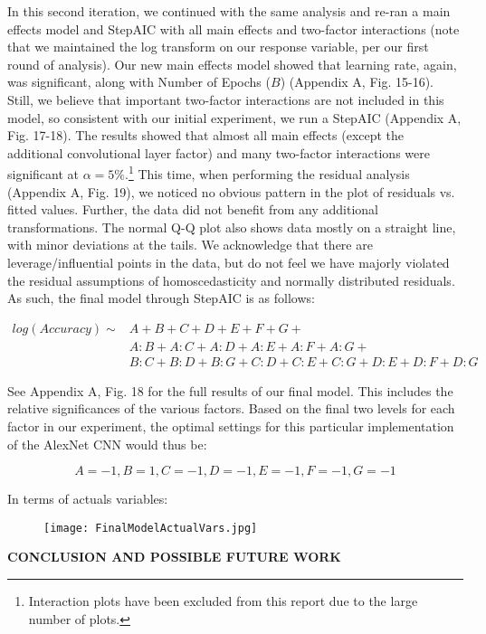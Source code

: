 \documentclass[12pt]{article}
\begin{document}
In this second iteration, we continued with the same analysis and re-ran a main effects model and StepAIC with all main effects and two-factor interactions (note that we maintained the log transform on our response variable, per our first round of analysis). Our new main effects model showed that learning rate, again, was significant, along with Number of Epochs ($B$) (Appendix A, Fig. 15-16). Still, we believe that important two-factor interactions are not included in this model, so consistent with our initial experiment, we run a StepAIC (Appendix A, Fig. 17-18). The results showed that almost all main effects (except the additional convolutional layer factor) and many two-factor interactions were significant at $\alpha = 5\%$.\footnote{Interaction plots have been excluded from this report due to the large number of plots. } This time, when performing the residual analysis (Appendix A, Fig. 19), we noticed no obvious pattern in the plot of residuals vs. fitted values. Further, the data did not benefit from any additional transformations.  The normal Q-Q plot also shows data mostly on a straight line, with minor deviations at the tails. We acknowledge that there are leverage/influential points in the data, but do not feel we have majorly violated the residual assumptions of homoscedasticity and normally distributed residuals. As such, the final model through StepAIC is as follows: 

$$
\begin{aligned}
log(Accuracy) \sim &A + B + C + D + E + F + G + \\
&A:B +  A:C + A:D + A:E + A:F + A:G + \\
&B:C + B:D + B:G + C:D + C:E + C:G + D:E + D:F + D:G 
\end{aligned}
$$

See Appendix A, Fig. 18 for the full results of our final model. This includes the relative significances of the various factors. Based on the final two levels for each factor in our experiment, the optimal settings for this particular implementation of the AlexNet CNN would thus be: 

$$A = -1, B = 1, C = -1, D = -1, E =- 1, F = -1, G = -1$$

In terms of actuals variables: 

\begin{figure}[h!]
  \texttt{[image: FinalModelActualVars.jpg]}
\end{figure}




\vspace{.75pc}
{\noindent \sc \textbf{CONCLUSION AND POSSIBLE FUTURE WORK}}
\vspace{.1pc}
\end{document}
